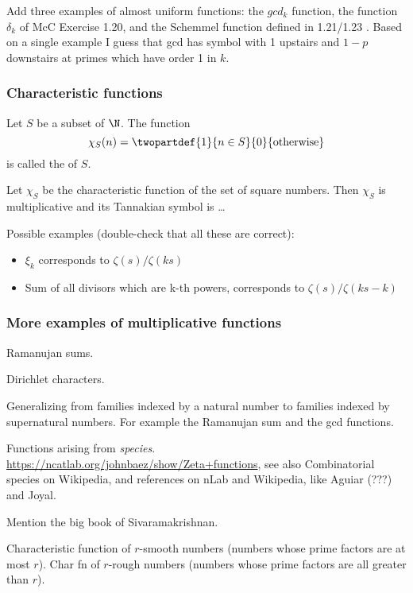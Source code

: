 \documentclass[a4paper]{article}
\begin{document}
Add three examples of almost uniform functions: the $gcd_k$ function, the function $\delta_k$ of McC Exercise 1.20, and the Schemmel function defined in 1.21/1.23 . Based on a single example I guess that gcd has symbol with 1 upstairs and $1-p$ downstairs at primes which have order 1 in $k$. 


\subsubsection{Characteristic functions}

\begin{definition}
Let $S$ be a subset of $\N$. The function
$$  \chi_S(n) =  \twopartdef { 1 } { n \in S } {0}  { \textrm{otherwise}} $$
is called the  of $S$.
\end{definition}

\begin{example}
Let $\chi_S$ be the characteristic function of the set of square numbers. Then $\chi_S$ is multiplicative and its Tannakian symbol is \ldots
\end{example}


Possible examples (double-check that all these are correct):
\begin{itemize}
\item $\xi_k$ corresponds to $\zeta(s)/ \zeta(ks)$
\item Sum of all divisors which are k-th powers, corresponds to $\zeta(s) / \zeta(ks-k)$
\end{itemize}

\subsubsection{More examples of multiplicative functions}

Ramanujan sums.

Dirichlet characters.

Generalizing from families indexed by a natural number to families indexed by supernatural numbers. For example the Ramanujan sum and the gcd functions.

Functions arising from \emph{species}. \url{https://ncatlab.org/johnbaez/show/Zeta+functions}, see also Combinatorial species on Wikipedia, and references on nLab and Wikipedia, like Aguiar (???) and Joyal. 

Mention the big book of Sivaramakrishnan.

Characteristic function of $r$-smooth numbers (numbers whose prime factors are at most $r$). Char fn of $r$-rough numbers (numbers whose prime factors are all greater than $r$).
\end{document}

